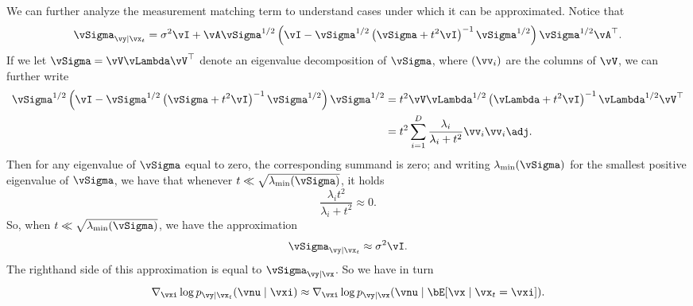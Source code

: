 \documentclass[../../book-main.tex]{subfiles}
\begin{document}
\begin{example}
  We can further analyze the measurement matching term to understand cases under
  which it can be approximated. Notice that
  \begin{equation}
    \vSigma_{\vy \mid \vx_t}
    =
    \sigma^2 \vI + \vA\vSigma^{1/2} \left(
      \vI - \vSigma^{1/2}\left(
      \vSigma + t^2 \vI
      \right)^{-1}
      \vSigma^{1/2}
    \right)\vSigma^{1/2}\vA^\top.
  \end{equation}
  If we let $\vSigma = \vV \vLambda \vV^\top$ denote an eigenvalue decomposition
  of $\vSigma$, where $(\vv_i)$ are the columns of $\vV$, we can further write
  \begin{align}
    \vSigma^{1/2}\left(
    \vI - \vSigma^{1/2}\left(
    \vSigma + t^2 \vI
    \right)^{-1}
    \vSigma^{1/2}
    \right) \vSigma^{1/2}
    &=
    t^2 \vV \vLambda^{1/2}\left(
      \vLambda + t^2 \vI
    \right)^{-1}
    \vLambda^{1/2}
    \vV^\top
    \\
    &=
    t^2 \sum_{i=1}^D
    \frac{\lambda_i}{\lambda_i + t^2}
    \vv_i \vv_i\adj.
  \end{align}
  Then for any eigenvalue of $\vSigma$ equal to zero, the corresponding summand
  is zero; and
  writing $\lambda_{\min}(\vSigma)$ for the smallest positive eigenvalue of
  $\vSigma$, we have
  that whenever $t \ll
  \sqrt{\lambda_{\min}(\vSigma)}$, it holds
  \begin{equation}
    \frac{\lambda_i t^2}{\lambda_i + t^2} \approx 0.
  \end{equation}
  So, when $t \ll \sqrt{\lambda_{\min}(\vSigma)}$, we have the approximation
  \begin{equation}
    \vSigma_{\vy \mid \vx_t} \approx \sigma^2 \vI.
  \end{equation}
  The righthand side of this approximation is equal to $\vSigma_{\vy \mid \vx}$.
  So we have in turn
  \begin{equation}
    \nabla_{\vxi} \log p_{\vy \mid \vx_t}(\vnu \mid \vxi)
    \approx
    \nabla_{\vxi} \log p_{\vy \mid \vx}(\vnu \mid \bE[\vx \mid \vx_t = \vxi]).
    \label{eq:conditional-posterior-measurementmatching-gaussian-case-dps-approx}
  \end{equation}


\end{example}
\end{document}
